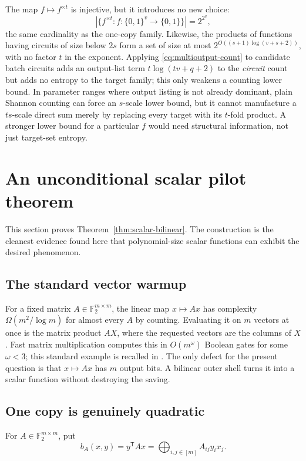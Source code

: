 \documentclass[11pt]{article}
\theoremstyle{definition}
\newcommand{\bits}{\{0,1\}}
\newcommand{\F}{\mathbb F}
\begin{document}
The map $f\mapsto f^{\times t}$ is injective, but it introduces no new choice:
\[
  \left|\{f^{\times t}:f:\bits^v\to\bits\}\right|=2^{2^v},
\]
the same cardinality as the one-copy family.  Likewise, the products of
functions having circuits of size below $2s$ form a set of size at most
$2^{O((s+1)\log(v+s+2))}$, with no factor $t$ in the exponent.  Applying
\eqref{eq:multioutput-count} to candidate batch circuits adds an output-list
term $t\log(tv+q+2)$ to the \emph{circuit} count but adds no entropy to the
target family; this only weakens a counting lower bound.  In parameter ranges
where output listing is not already dominant, plain Shannon counting can
force an $s$-scale lower bound, but it cannot manufacture a $ts$-scale direct
sum merely by replacing every target with its $t$-fold product.  A stronger
lower bound for a particular $f$ would need structural information, not just
target-set entropy.

\section{An unconditional scalar pilot theorem}
\label{sec:bilinear}

This section proves Theorem~\ref{thm:scalar-bilinear}.  The construction is
the cleanest evidence found here that polynomial-size scalar functions can
exhibit the desired phenomenon.

\subsection{The standard vector warmup}

For a fixed matrix $A\in\F_2^{m\times m}$, the linear map $x\mapsto Ax$ has
complexity $\Omega(m^2/\log m)$ for almost every $A$ by counting.  Evaluating
it on $m$ vectors at once is the matrix product $AX$, where the requested
vectors are the columns of $X$.  Fast matrix multiplication computes this in
$O(m^\omega)$ Boolean gates for some $\omega<3$; this standard example is
recalled in \cite{Kretschmer2023}.  The only defect for the present question
is that $x\mapsto Ax$ has $m$ output bits.  A bilinear outer shell turns it
into a scalar function without destroying the saving.

\subsection{One copy is genuinely quadratic}

For $A\in\F_2^{m\times m}$, put
\[
  b_A(x,y)=y^{\mathsf T}Ax
    =\bigoplus_{i,j\in[m]} A_{ij}y_i x_j.
\]
\end{document}
